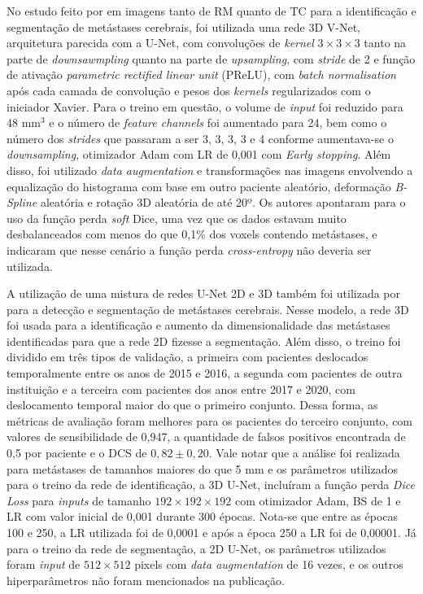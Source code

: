 No estudo feito por \cite{Hsu:2021} em imagens tanto de RM quanto de TC para a identificação e segmentação de metástases cerebrais, foi utilizada uma rede 3D V-Net, arquitetura parecida com a U-Net, com convoluções de \textit{kernel} $3\times3\times3$ tanto na parte de \textit{downsawmpling} quanto na parte de \textit{upsampling}, com \textit{stride} de 2 e função de ativação \textit{parametric rectified linear unit} (PReLU), com \textit{batch normalisation} após cada camada de convolução e pesos dos \textit{kernels} regularizados com o iniciador Xavier. Para o treino em questão, o volume de \textit{input} foi reduzido para 48 mm$^3$ e o número de \textit{feature channels} foi aumentado para 24, bem como o número dos \textit{strides} que passaram a ser 3, 3, 3, 3 e 4 conforme aumentava-se o \textit{downsampling}, otimizador Adam com LR de 0,001 com \textit{Early stopping}. Além disso, foi utilizado \textit{data augmentation} e transformações nas imagens envolvendo a equalização do histograma com base em outro paciente aleatório, deformação \textit{B-Spline} aleatória e rotação 3D aleatória de até 20º. Os autores apontaram para o uso da função perda \textit{soft} Dice, uma vez que os dados estavam muito desbalanceados com menos do que 0,1\% dos voxels contendo metástases, e indicaram que nesse cenário a função perda \textit{cross-entropy} não deveria ser utilizada. 

A utilização de uma mistura de redes U-Net 2D e 3D também foi utilizada por \cite{Cho:2021} para a detecção e segmentação de metástases cerebrais. Nesse modelo, a rede 3D foi usada para a identificação e aumento da dimensionalidade das metástases identificadas para que a rede 2D fizesse a segmentação. Além disso, o treino foi dividido em três tipos de validação, a primeira com pacientes deslocados temporalmente entre os anos de 2015 e 2016, a segunda com pacientes de outra instituição e a terceira com pacientes dos anos entre 2017 e 2020, com deslocamento temporal maior do que o primeiro conjunto. Dessa forma, as métricas de avaliação foram melhores para os pacientes do terceiro conjunto, com valores de sensibilidade de 0,947, a quantidade de falsos positivos encontrada de 0,5 por paciente e o DCS de $0,82 \pm 0,20$. Vale notar que a análise foi realizada para metástases de tamanhos maiores do que 5 mm e os parâmetros utilizados para o treino da rede de identificação, a 3D U-Net, incluíram a função perda \textit{Dice Loss} para \textit{inputs} de tamanho $192\times192\times192$ com otimizador Adam, BS de 1 e LR com valor inicial de 0,001 durante 300 épocas. Nota-se que entre as épocas 100 e 250, a LR utilizada foi de 0,0001 e após a época 250 a LR foi de 0,00001. Já para o treino da rede de segmentação, a 2D U-Net, os parâmetros utilizados foram \textit{input} de $512\times512$ pixels com \textit{data augmentation} de 16 vezes, e os outros hiperparâmetros não foram mencionados na publicação.

